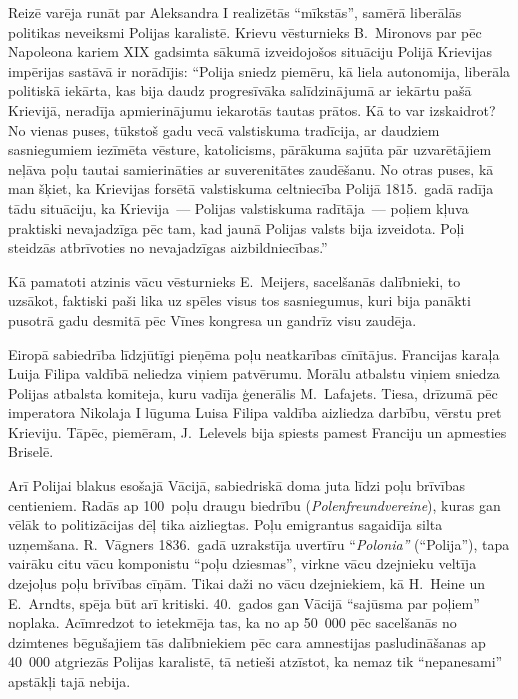 \documentclass[twoside,a5paper,12pt,fleqn,openany]{extbook}
\newcommand{\detxti}[1]{\textit{\textgerman{#1}}}
\begin{document}
Reizē varēja runāt par Aleksandra I realizētās ``mīkstās'', samērā liberālās politikas neveiksmi Polijas karalistē. Krievu vēsturnieks B.~Mironovs par pēc Napoleona kariem XIX gadsimta sākumā izveidojošos situāciju Polijā Krievijas impērijas sastāvā ir norādījis: ``Polija sniedz piemēru, kā liela autonomija, liberāla politiskā iekārta, kas bija daudz progresīvāka salīdzinājumā ar iekārtu pašā Krievijā, neradīja apmierinājumu iekarotās tautas prātos. Kā to var izskaidrot? No vienas puses, tūkstoš gadu vecā valstiskuma tradīcija, ar daudziem sasniegumiem iezīmēta vēsture, katolicisms, pārākuma sajūta pār uzvarētājiem neļāva poļu tautai samierināties ar suverenitātes zaudēšanu. No otras puses, kā man šķiet, ka Krievijas forsētā valstiskuma celtniecība Polijā 1815.~gadā radīja tādu situāciju, ka Krievija~--- Polijas valstiskuma radītāja~--- poļiem kļuva praktiski nevajadzīga pēc tam, kad jaunā Polijas valsts bija izveidota. Poļi steidzās atbrīvoties no nevajadzīgas aizbildniecības.''

Kā pamatoti atzinis vācu vēsturnieks E.~Meijers, sacelšanās dalībnieki, to uzsākot, faktiski paši lika uz spēles visus tos sasniegumus, kuri bija panākti pusotrā gadu desmitā pēc Vīnes kongresa un gandrīz visu zaudēja.

Eiropā sabiedrība līdzjūtīgi pieņēma poļu neatkarības cīnītājus. Francijas karaļa Luija Filipa valdībā neliedza viņiem patvērumu. Morālu atbalstu viņiem sniedza Polijas atbalsta komiteja, kuru vadīja ģenerālis M.~Lafajets. Tiesa, drīzumā pēc imperatora Nikolaja I lūguma Luisa Filipa valdība aizliedza darbību, vērstu pret Krieviju. Tāpēc, piemēram, J.~Lelevels bija spiests pamest Franciju un apmesties Briselē.

Arī Polijai blakus esošajā Vācijā, sabiedriskā doma juta līdzi poļu brīvības centieniem. Radās ap 100~poļu draugu biedrību (\detxti{Polenfreundvereine}), kuras gan vēlāk to politizācijas dēļ tika aizliegtas. Poļu emigrantus sagaidīja silta uzņemšana. R.~Vāgners 1836.~gadā uzrakstīja uvertīru ``\detxti{Polonia''} (``Polija''), tapa vairāku citu vācu komponistu ``poļu dziesmas'', virkne vācu dzejnieku veltīja dzejoļus poļu brīvības cīņām. Tikai daži no vācu dzejniekiem, kā H.~Heine un E.~Arndts, spēja būt arī kritiski. 40.~gados gan Vācijā ``sajūsma par poļiem'' noplaka. Acīmredzot to ietekmēja tas, ka no ap 50~000 pēc sacelšanās no dzimtenes bēgušajiem tās dalībniekiem pēc cara amnestijas pasludināšanas ap 40~000 atgriezās Polijas karalistē, tā netieši atzīstot, ka nemaz tik ``nepanesami'' apstākļi tajā nebija.
\end{document}
